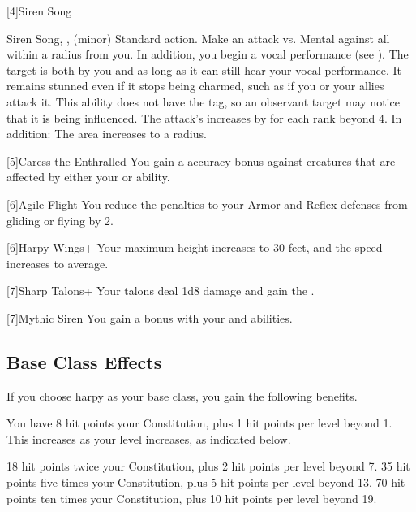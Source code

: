     [4]{Siren Song}
      \begin{magicalsustainability}{Siren Song}{, ,  (minor)}
        \abilityusagetime Standard action.
        \rankline
        Make an attack vs. Mental against all  within a \medarea radius from you.
        In addition, you begin a vocal performance (see ).
        \hit The target is both \charmed by you and \stunned as long as it can still hear your vocal performance.
        It remains stunned even if it stops being charmed, such as if you or your allies attack it.
        This ability does not have the  tag, so an observant target may notice that it is being influenced.
        \rankline
        The attack's  increases by  for each rank beyond 4.
        In addition:
         The area increases to a \largearea radius.
      \end{magicalsustainability}

    [5]{Caress the Enthralled} You gain a  accuracy bonus against creatures that are affected by either your  or  ability.

    [6]{Agile Flight} You reduce the penalties to your Armor and Reflex defenses from gliding or flying by 2.

    [6]{Harpy Wings+} Your maximum height increases to 30 feet, and the speed increases to average.

    [7]{Sharp Talons+} Your talons deal 1d8 damage and gain the  .

    [7]{Mythic Siren} You gain a   bonus with your  and  abilities.

  \subsection{Base Class Effects}
    \mediumhpprogressiontable

    If you choose harpy as your base class, you gain the following benefits.

      You have 8 hit points \add  your Constitution, plus 1 hit points per level beyond 1.
      This increases as your level increases, as indicated below.
      \begin{raggeditemize}
         18 hit points \add twice your Constitution, plus 2 hit points per level beyond 7.
         35 hit points \add five times your Constitution, plus 5 hit points per level beyond 13.
         70 hit points \add ten times your Constitution, plus 10 hit points per level beyond 19.
      \end{raggeditemize}

